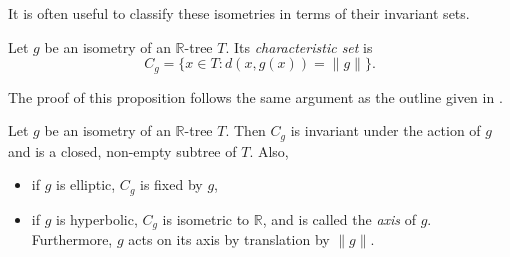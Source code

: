 It is often useful to classify these isometries in terms of their invariant sets.
\begin{definition}
    Let $g$ be an isometry of an $\mathbb{R}$-tree $T$. Its \emph{characteristic set} is \[C_g = \{x\in T:d(x,g(x))=\lVert g \rVert\}.\]
\end{definition}
The proof of this proposition follows the same argument as the outline given in \cite{CullerMorgan}.
\begin{proposition}
    Let $g$ be an isometry of an $\mathbb{R}$-tree $T$. Then $C_g$ is invariant under the action of $g$ and is a closed, non-empty subtree of $T$. Also,
    \begin{itemize}
        \item if $g$ is elliptic, $C_g$ is fixed by $g$,
        \item if $g$ is hyperbolic, $C_g$ is isometric to $\mathbb{R}$, and is called the \emph{axis} of $g$. Furthermore, $g$ acts on its axis by translation by $\lVert g\rVert$.
    \end{itemize}
\end{proposition}
